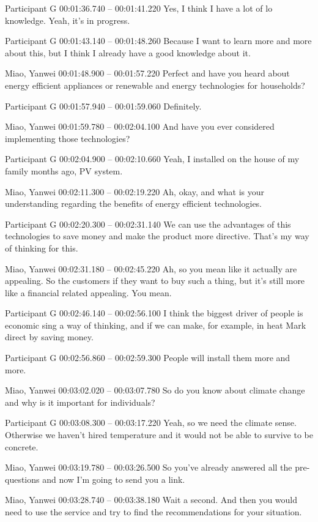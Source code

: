{Participant G 00:01:36.740 -- 00:01:41.220
Yes, I think I have a lot of lo knowledge. Yeah, it's in progress.

Participant G 00:01:43.140 -- 00:01:48.260
Because I want to learn more and more about this, but I think I already have a good knowledge about it.

Miao, Yanwei 00:01:48.900 -- 00:01:57.220
Perfect and have you heard about energy efficient appliances or renewable and energy technologies for households?

Participant G 00:01:57.940 -- 00:01:59.060
Definitely.

Miao, Yanwei 00:01:59.780 -- 00:02:04.100
And have you ever considered implementing those technologies?

Participant G 00:02:04.900 -- 00:02:10.660
Yeah, I installed on the house of my family months ago, PV system.

Miao, Yanwei 00:02:11.300 -- 00:02:19.220
Ah, okay, and what is your understanding regarding the benefits of energy efficient technologies.

Participant G 00:02:20.300 -- 00:02:31.140
We can use the advantages of this technologies to save money and make the product more directive. That's my way of thinking for this.

Miao, Yanwei 00:02:31.180 -- 00:02:45.220
Ah, so you mean like it actually are appealing. So the customers if they want to buy such a thing, but it's still more like a financial related appealing. You mean.

Participant G 00:02:46.140 -- 00:02:56.100
I think the biggest driver of people is economic sing a way of thinking, and if we can make, for example, in heat Mark direct by saving money.

Participant G 00:02:56.860 -- 00:02:59.300
People will install them more and more.

Miao, Yanwei 00:03:02.020 -- 00:03:07.780
So do you know about climate change and why is it important for individuals?

Participant G 00:03:08.300 -- 00:03:17.220
Yeah, so we need the climate sense. Otherwise we haven't hired temperature and it would not be able to survive to be concrete.

Miao, Yanwei 00:03:19.780 -- 00:03:26.500
So you've already answered all the pre- questions and now I'm going to send you a link.

Miao, Yanwei 00:03:28.740 -- 00:03:38.180
Wait a second. And then you would need to use the service and try to find the recommendations for your situation.

}
